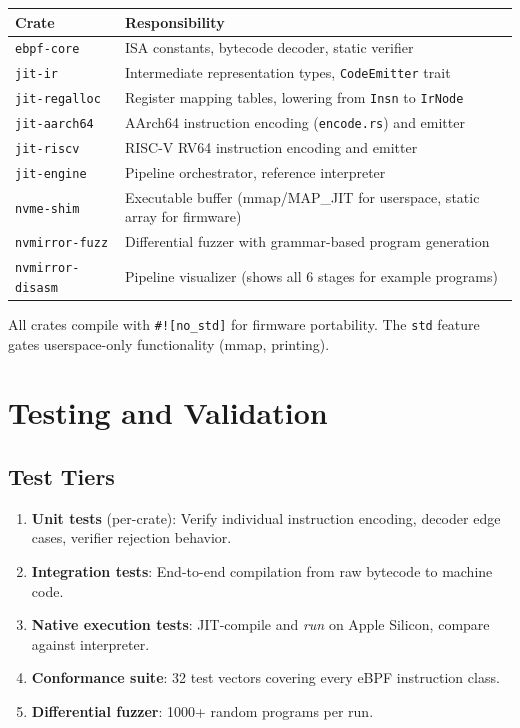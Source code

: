 \documentclass[11pt,letterpaper]{article}
\begin{document}
\begin{center}
\begin{tabular}{lp{8cm}}
\toprule
\textbf{Crate} & \textbf{Responsibility} \\
\midrule
\texttt{ebpf-core} & ISA constants, bytecode decoder, static verifier \\
\texttt{jit-ir} & Intermediate representation types, \texttt{CodeEmitter} trait \\
\texttt{jit-regalloc} & Register mapping tables, lowering from \texttt{Insn} to \texttt{IrNode} \\
\texttt{jit-aarch64} & AArch64 instruction encoding (\texttt{encode.rs}) and emitter \\
\texttt{jit-riscv} & RISC-V RV64 instruction encoding and emitter \\
\texttt{jit-engine} & Pipeline orchestrator, reference interpreter \\
\texttt{nvme-shim} & Executable buffer (mmap/MAP\_JIT for userspace, static array for firmware) \\
\texttt{nvmirror-fuzz} & Differential fuzzer with grammar-based program generation \\
\texttt{nvmirror-disasm} & Pipeline visualizer (shows all 6 stages for example programs) \\
\bottomrule
\end{tabular}
\end{center}

All crates compile with \texttt{\#![no\_std]} for firmware portability. The \texttt{std} feature gates userspace-only functionality (mmap, printing).

\section{Testing and Validation}

\subsection{Test Tiers}

\begin{enumerate}
    \item \textbf{Unit tests} (per-crate): Verify individual instruction encoding, decoder edge cases, verifier rejection behavior.
    \item \textbf{Integration tests}: End-to-end compilation from raw bytecode to machine code.
    \item \textbf{Native execution tests}: JIT-compile and \emph{run} on Apple Silicon, compare against interpreter.
    \item \textbf{Conformance suite}: 32 test vectors covering every eBPF instruction class.
    \item \textbf{Differential fuzzer}: 1000+ random programs per run.
\end{enumerate}
\end{document}
